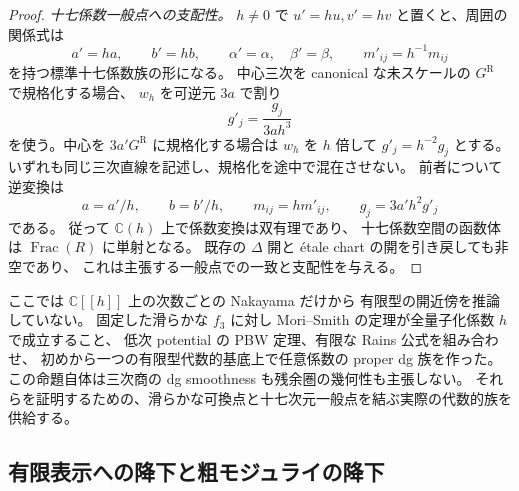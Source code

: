 \begin{proof}
\emph{十七係数一般点への支配性。}
$h\ne0$ で $u'=hu,v'=hv$ と置くと、周囲の関係式は
\[
 a'=ha,\qquad b'=hb,\qquad
 \alpha'=\alpha,\quad\beta'=\beta,\qquad m'_{ij}=h^{-1}m_{ij}
\]
を持つ標準十七係数族の形になる。
中心三次を canonical な未スケールの $G^{\mathrm R}$ で規格化する場合、
$w_h$ を可逆元 $3a$ で割り
\[
 g'_j=\frac{g_j}{3ah^3}
\]
を使う。中心を $3a'G^{\mathrm R}$ に規格化する場合は
$w_h$ を $h$ 倍して $g'_j=h^{-2}g_j$ とする。
いずれも同じ三次直線を記述し、規格化を途中で混在させない。
前者について逆変換は
\[
 a=a'/h,\qquad b=b'/h,\qquad
 m_{ij}=hm'_{ij},\qquad g_j=3a'h^2g'_j
\]
である。
従って $\mathbb C(h)$ 上で係数変換は双有理であり、
十七係数空間の函数体は $\operatorname{Frac}(R)$ に単射となる。
既存の $\Delta$ 開と étale chart の開を引き戻しても非空であり、
これは主張する一般点での一致と支配性を与える。
\end{proof}

\begin{remark}[この橋渡しが解決する点]
ここでは $\mathbb C[[h]]$ 上の次数ごとの Nakayama だけから
有限型の開近傍を推論していない。
固定した滑らかな $f_3$ に対し Mori--Smith の定理が全量子化係数 $h$ で成立すること、
低次 potential の PBW 定理、有限な Rains 公式を組み合わせ、
初めから一つの有限型代数的基底上で任意係数の proper dg 族を作った。
この命題自体は三次商の dg smoothness も残余圏の幾何性も主張しない。
それらを証明するための、滑らかな可換点と十七次元一般点を結ぶ実際の代数的族を供給する。
\end{remark}


\subsection{有限表示への降下と粗モジュライの降下}

